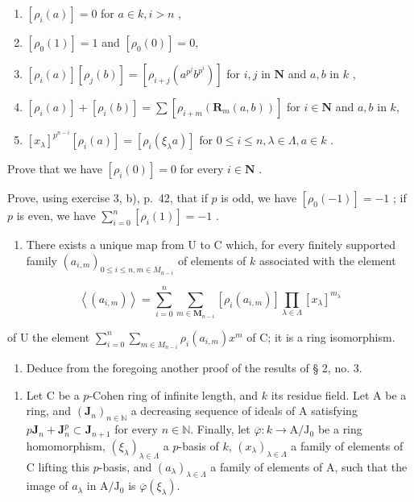 \begin{enumerate}
\def\labelenumi{(\roman{enumi})}
\item
  \([\rho_i(a)] = 0\) for \(a \in k, i > n\) ,
\item
  \(\left[\rho_0(1)\right] = 1\) and \(\left[\rho_0(0)\right] = 0,\)
\item
  \([\rho_i(a)][\rho_j(b)] = [\rho_{i + j}(a^{p^j}b^{p^i})]\) for \(i,j\) in \(\mathbf{N}\) and \(a,b\) in \(k\) ,
\item
  \([\rho_i(a)] + [\rho_i(b)] = \sum [\rho_{i+m}(\mathbf{R}_m(a,b))]\) for \(i\in \mathbf{N}\) and \(a,b\) in \(k,\)
\item
  \([x_{\lambda}]^{p^{n - i}}[\rho_i(a)] = [\rho_i(\xi_{\lambda}a)]\) for \(0 \leqslant i \leqslant n, \lambda \in \Lambda, a \in k\) .
\end{enumerate}

Prove that we have \([\rho_i(0)] = 0\) for every \(i \in \mathbf{N}\) .

Prove, using exercise 3, b), p.~42, that if \(p\) is odd, we have \([\rho_0(-1)] = -1\) ; if \(p\) is even, we have \(\sum_{i=0}^{n} [\rho_i(1)] = -1\) .

\begin{enumerate}
\def\labelenumi{\alph{enumi})}
\setcounter{enumi}{2}
\tightlist
\item
  There exists a unique map from U to C which, for every finitely supported family \((a_{i,m})_{0\leqslant i\leqslant n,m\in M_{n - i}}\) of elements of \(k\) associated with the element
\end{enumerate}

\[
\left\langle \left(a _ {i, m}\right) \right\rangle = \sum_ {i = 0} ^ {n} \sum_ {m \in \mathbf {M} _ {n - i}} \left[ \rho_ {i} (a _ {i, m}) \right] \prod_ {\lambda \in \Lambda} [ x _ {\lambda} ] ^ {m _ {\lambda}}
\]

of U the element \(\sum_{i=0}^{n}\sum_{m\in M_{n-i}}\rho_i(a_{i,m})x^m\) of C; it is a ring isomorphism.

\begin{enumerate}
\def\labelenumi{\alph{enumi})}
\setcounter{enumi}{3}
\tightlist
\item
  Deduce from the foregoing another proof of the results of § 2, no. 3.
\end{enumerate}

\begin{enumerate}
\def\labelenumi{\arabic{enumi})}
\setcounter{enumi}{3}
\tightlist
\item
  Let C be a \(p\)-Cohen ring of infinite length, and \(k\) its residue field. Let A be a ring, and \((\mathbf{J}_n)_{n \in \mathbb{N}}\) a decreasing sequence of ideals of A satisfying \(p\mathbf{J}_n + \mathbf{J}_n^p \subset \mathbf{J}_{n+1}\) for every \(n \in \mathbb{N}\). Finally, let \(\overline{\varphi}: k \to \mathrm{A} / \mathrm{J}_0\) be a ring homomorphism, \((\xi_\lambda)_{\lambda \in \Lambda}\) a \(p\)-basis of \(k\), \((x_\lambda)_{\lambda \in \Lambda}\) a family of elements of C lifting this \(p\)-basis, and \((a_\lambda)_{\lambda \in \Lambda}\) a family of elements of A, such that the image of \(a_\lambda\) in \(\mathrm{A} / \mathrm{J}_0\) is \(\overline{\varphi}(\xi_\lambda)\).
\end{enumerate}

